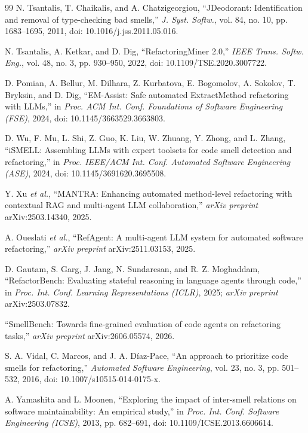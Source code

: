 \documentclass[journal,onecolumn,11pt]{IEEEtran}
\begin{document}
\begin{thebibliography}{99}
 N. Tsantalis, T. Chaikalis, and A. Chatzigeorgiou, ``JDeodorant: Identification and removal of type-checking bad smells,'' \emph{J. Syst. Softw.}, vol. 84, no. 10, pp. 1683--1695, 2011, doi: 10.1016/j.jss.2011.05.016.

 N. Tsantalis, A. Ketkar, and D. Dig, ``RefactoringMiner 2.0,'' \emph{IEEE Trans. Softw. Eng.}, vol. 48, no. 3, pp. 930--950, 2022, doi: 10.1109/TSE.2020.3007722.

 D. Pomian, A. Bellur, M. Dilhara, Z. Kurbatova, E. Bogomolov, A. Sokolov, T. Bryksin, and D. Dig, ``EM-Assist: Safe automated ExtractMethod refactoring with LLMs,'' in \emph{Proc. ACM Int. Conf. Foundations of Software Engineering (FSE)}, 2024, doi: 10.1145/3663529.3663803.

 D. Wu, F. Mu, L. Shi, Z. Guo, K. Liu, W. Zhuang, Y. Zhong, and L. Zhang, ``iSMELL: Assembling LLMs with expert toolsets for code smell detection and refactoring,'' in \emph{Proc. IEEE/ACM Int. Conf. Automated Software Engineering (ASE)}, 2024, doi: 10.1145/3691620.3695508.

 Y. Xu \emph{et al.}, ``MANTRA: Enhancing automated method-level refactoring with contextual RAG and multi-agent LLM collaboration,'' \emph{arXiv preprint} arXiv:2503.14340, 2025.

 A. Oueslati \emph{et al.}, ``RefAgent: A multi-agent LLM system for automated software refactoring,'' \emph{arXiv preprint} arXiv:2511.03153, 2025.

 D. Gautam, S. Garg, J. Jang, N. Sundaresan, and R. Z. Moghaddam, ``RefactorBench: Evaluating stateful reasoning in language agents through code,'' in \emph{Proc. Int. Conf. Learning Representations (ICLR)}, 2025; \emph{arXiv preprint} arXiv:2503.07832.

 ``SmellBench: Towards fine-grained evaluation of code agents on refactoring tasks,'' \emph{arXiv preprint} arXiv:2606.05574, 2026.

 S. A. Vidal, C. Marcos, and J. A. D\'iaz-Pace, ``An approach to prioritize code smells for refactoring,'' \emph{Automated Software Engineering}, vol. 23, no. 3, pp. 501--532, 2016, doi: 10.1007/s10515-014-0175-x.

 A. Yamashita and L. Moonen, ``Exploring the impact of inter-smell relations on software maintainability: An empirical study,'' in \emph{Proc. Int. Conf. Software Engineering (ICSE)}, 2013, pp. 682--691, doi: 10.1109/ICSE.2013.6606614.


\end{thebibliography}
\end{document}
